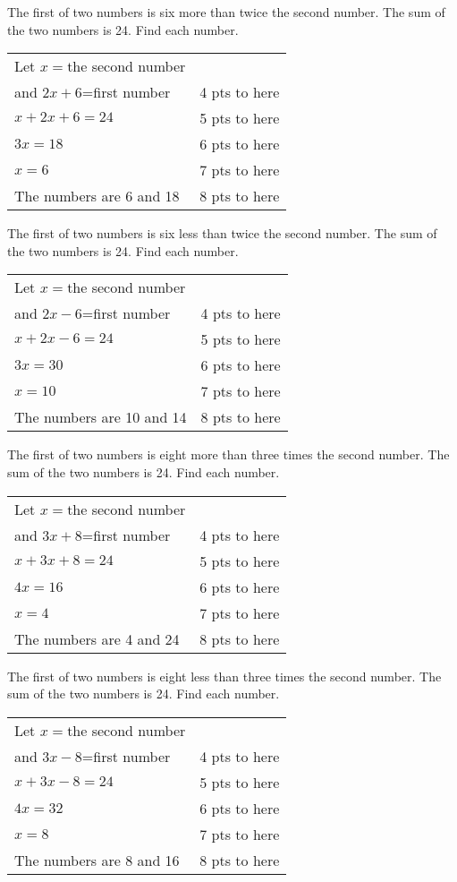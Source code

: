 {
	The first of two numbers is six more than twice the second number. The sum of the two numbers is 24. Find each number.
}
{
	\begin{tabular}{l r}
	Let $x=$the second number\\ and $2x+6$=first number & 4 pts to here\\
	$x+2x+6=24$ & 5 pts to here\\
	$3x=18$ & 6 pts to here\\
	$x=6$ & 7 pts to here\\
	The numbers are 6 and 18 & 8 pts to here
	\end{tabular}
}

{
	The first of two numbers is six less than twice the second number. The sum of the two numbers is 24. Find each number.
}
{
	\begin{tabular}{l r}
	Let $x=$the second number\\ and $2x-6$=first number & 4 pts to here\\
	$x+2x-6=24$ & 5 pts to here\\
	$3x=30$ & 6 pts to here\\
	$x=10$ & 7 pts to here\\
	The numbers are 10 and 14 & 8 pts to here
	\end{tabular}
}

{
	The first of two numbers is eight more than three times the second number. The sum of the two numbers is 24. Find each number.
}
{
	\begin{tabular}{l r}
	Let $x=$the second number\\ and $3x+8$=first number & 4 pts to here\\
	$x+3x+8=24$ & 5 pts to here\\
	$4x=16$ & 6 pts to here\\
	$x=4$ & 7 pts to here\\
	The numbers are 4 and 24 & 8 pts to here
	\end{tabular}
}

{
	The first of two numbers is eight less than three times the second number. The sum of the two numbers is 24. Find each number.
}
{
	\begin{tabular}{l r}
	Let $x=$the second number\\ and $3x-8$=first number & 4 pts to here\\
	$x+3x-8=24$ & 5 pts to here\\
	$4x=32$ & 6 pts to here\\
	$x=8$ & 7 pts to here\\
	The numbers are 8 and 16 & 8 pts to here
	\end{tabular}
}

